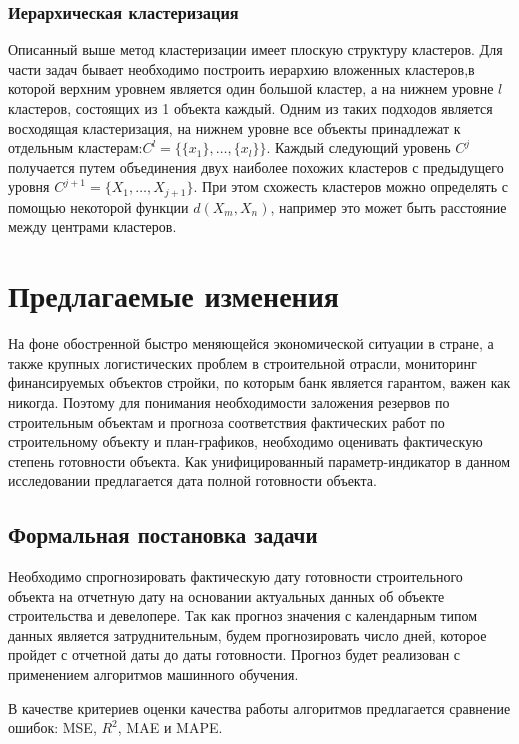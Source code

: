 \documentclass[12pt,a4paper]{article} %
\begin{document}
\subsubsection{Иерархическая кластеризация}
Описанный выше метод кластеризации имеет плоскую структуру кластеров. Для части задач бывает необходимо построить иерархию вложенных кластеров,в которой верхним уровнем является один большой кластер, а на нижнем уровне $l$ кластеров, состоящих из 1 объекта каждый. Одним из таких подходов является восходящая кластеризация, на нижнем уровне все объекты принадлежат к отдельным кластерам:$C^l = \{\{x_1\},\dots,\{x_l\}\}$. Каждый следующий уровень $C^j$ получается путем объединения двух наиболее похожих кластеров с предыдущего уровня $C^{j+1}= \{X_1, \dots,X_{j+1}\}$. При этом схожесть кластеров можно определять с помощью некоторой функции $d(X_m, X_n)$, например это может быть расстояние между центрами кластеров.


\newpage
\section{Предлагаемые изменения}
На фоне обостренной быстро меняющейся экономической ситуации в стране, а также крупных логистических проблем в строительной отрасли, мониторинг финансируемых объектов стройки, по которым банк является гарантом, важен как никогда.
Поэтому для понимания необходимости заложения резервов по строительным объектам и прогноза соответствия фактических работ по строительному объекту и план-графиков, необходимо оценивать фактическую степень готовности объекта. Как унифицированный параметр-индикатор в данном исследовании предлагается дата полной готовности объекта.   

\subsection{Формальная постановка задачи}

Необходимо спрогнозировать фактическую дату готовности строительного объекта на отчетную дату на основании актуальных данных об объекте строительства и девелопере. Так как прогноз значения с календарным типом данных является затруднительным, будем прогнозировать число дней, которое пройдет с отчетной даты до даты готовности. Прогноз будет реализован с применением алгоритмов машинного обучения.

В качестве критериев оценки качества работы алгоритмов предлагается сравнение ошибок: MSE, $R^2$, MAE и MAPE.
\end{document}
